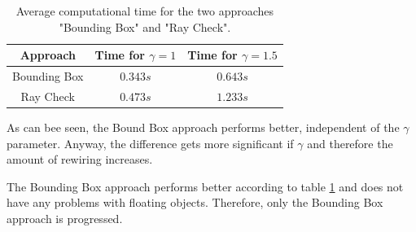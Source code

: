 \begin{table}[H] 
\begin{center}
    \begin{tabular}{ | c | c | c |}
    \hline
    Approach &  Time for $\gamma = 1$ &  Time for $\gamma = 1.5$ \\ \hline
    Bounding Box & $0.343s$  & $0.643s$  \\ \hline
    Ray Check & $0.473s$ & $1.233s$ \\
    \hline
    \end{tabular}
\caption{Average computational time for the two approaches "Bounding Box" and "Ray Check".}
    \label{tab:RayCheck}
\end{center}
\end{table}

As can bee seen, the Bound Box approach performs better, independent of the $\gamma$ parameter. Anyway, the difference gets more significant if $\gamma$ and therefore the amount of rewiring increases.\newline

The Bounding Box approach performs better according to table \ref{tab:RayCheck} and does not have any problems with floating objects. Therefore, only the Bounding Box approach is progressed. 








%
%
%
%
%
